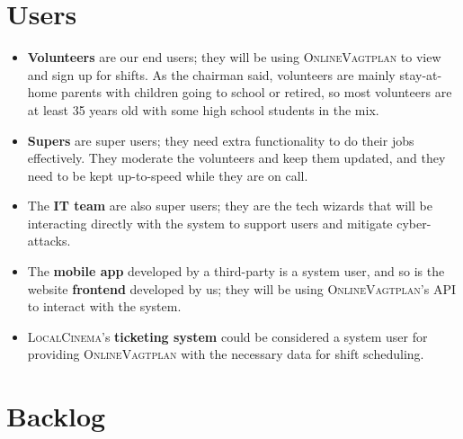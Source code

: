 \section*{Users}

\begin{itemize}
	\item \textbf{Volunteers} are our end users;
	      they will be using \textsc{OnlineVagtplan}
	      to view and sign up for shifts.
	      As the chairman said,
	      volunteers are mainly stay-at-home parents with children going to school or retired,
	      so most volunteers are at least 35 years old
	      with some high school students in the mix.

	\item \textbf{Supers} are super users;
	      they need extra functionality to do their jobs effectively.
	      They moderate the volunteers and keep them updated,
	      and they need to be kept up-to-speed while they are on call.

	\item The \textbf{IT team} are also super users;
	      they are the tech wizards that will be interacting directly with the system
	      to support users and mitigate cyber-attacks.

	\item The \textbf{mobile app} developed by a third-party is a system user,
	      and so is the website \textbf{frontend} developed by us;
	      they will be using \textsc{OnlineVagtplan}'s API
	      to interact with the system.

	\item \textsc{LocalCinema}'s \textbf{ticketing system}
	      could be considered a system user for providing \textsc{OnlineVagtplan}
	      with the necessary data for shift scheduling.
\end{itemize}

\section*{Backlog}



